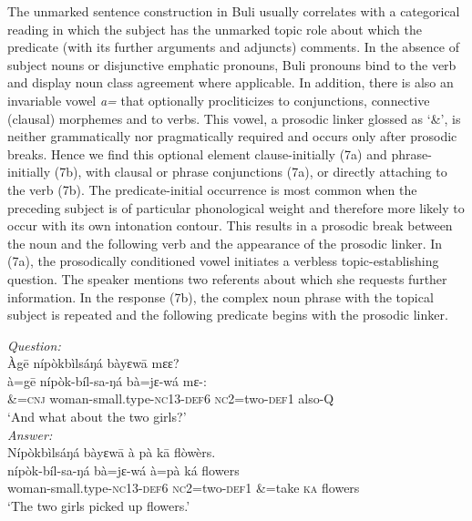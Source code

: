 \documentclass[output=paper]{langsci/langscibook}
\begin{document}
The unmarked sentence construction in Buli usually correlates with a categorical reading in which the subject has the unmarked topic role about which the predicate (with its further arguments and adjuncts) comments. In the absence of subject nouns or disjunctive emphatic pronouns, Buli pronouns bind to the verb and display noun class agreement where applicable. In addition, there is also an invariable vowel \textit{a=} that optionally procliticizes to conjunctions, connective (clausal) morphemes and to verbs. This vowel, a prosodic linker glossed as ‘\&’, is neither grammatically nor pragmatically required and occurs only after prosodic breaks. Hence we find this optional element clause-initially (7a) and phrase-initially (7b), with clausal or phrase conjunctions (7a), or directly attaching to the verb (7b). The predicate-initial occurrence is most common when the preceding subject is of particular phonological weight and therefore more likely to occur with its own intonation contour. This results in a prosodic break between the noun and the following verb and the appearance of the prosodic linker. In (7a), the prosodically conditioned vowel initiates a verbless topic-establishing question. The speaker mentions two referents about which she requests further information. In the response (7b), the complex noun phrase with the topical subject is repeated and the following predicate begins with the prosodic linker.  

\begin{exe}
	\ex\label{schwarz:7a}\begin{xlist}
		\ex \textit{Question:} \\ 
        \glll Àg\={e} {nípòkbìlsáŋá}    {bàyɛw\={a}}    {mɛɛ?} \\
			\textup{à=g\={e}}  {nípòk-bíl-sa-ŋá}      {bà=jɛ-wá}    {mɛ-:}\\
			\&=\textsc{cnj}  woman-small.type-\textsc{nc}13-\textsc{def}6  \textsc{nc}2=two-\textsc{def}1  also-\textsc{Q}\\
\glt   ‘And what about the two girls?’ \\
		\ex \textit{Answer:} \\
        \glll Nípòkbìlsáŋá  bàyɛw\={a}  {à pà}  k\={a}  flòwèrs.\\
			 nípòk-bíl-sa-ŋá  bà=jɛ-wá  à=pà  ká  flowers\\
			woman-small.type-\textsc{nc}13-\textsc{def}6  \textsc{nc}2=two-\textsc{def}1  \&=take  \textsc{ka}  flowers\\
    \glt ‘The two girls picked up flowers.’
	\end{xlist}
\end{exe}
\end{document}
